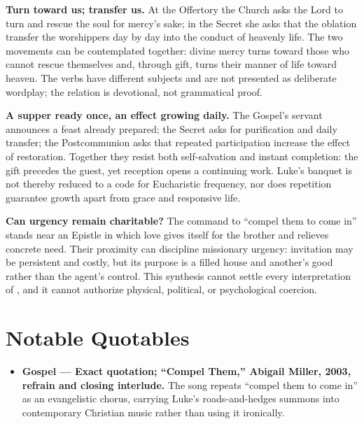 \begin{deepstudy}
\noindent\textbf{Turn toward us; transfer us.\enspace{}}
At the Offertory the Church asks the Lord to turn and rescue the soul for mercy's sake; in the Secret she asks that the oblation transfer the worshippers day by day into the conduct of heavenly life. The two movements can be contemplated together: divine mercy turns toward those who cannot rescue themselves and, through gift, turns their manner of life toward heaven. The verbs have different subjects and are not presented as deliberate wordplay; the relation is devotional, not grammatical proof.

\noindent\textbf{A supper ready once, an effect growing daily.\enspace{}}
The Gospel's servant announces a feast already prepared; the Secret asks for purification and daily transfer; the Postcommunion asks that repeated participation increase the effect of restoration. Together they resist both self-salvation and instant completion: the gift precedes the guest, yet reception opens a continuing work. Luke's banquet is not thereby reduced to a code for Eucharistic frequency, nor does repetition guarantee growth apart from grace and responsive life.

\noindent\textbf{Can urgency remain charitable?\enspace{}}
The command to ``compel them to come in'' stands near an Epistle in which love gives itself for the brother and relieves concrete need. Their proximity can discipline missionary urgency: invitation may be persistent and costly, but its purpose is a filled house and another's good rather than the agent's control. This synthesis cannot settle every interpretation of , and it cannot authorize physical, political, or psychological coercion.

\sectionguard
\section*{Notable Quotables}
{\small
\begin{itemize}[itemsep=0em,topsep=0.15em,parsep=0pt]
\item \textbf{Gospel --- Exact quotation; ``Compel Them,'' Abigail Miller, 2003, refrain and closing interlude.} The song repeats ``compel them to come in'' as an evangelistic chorus, carrying Luke's roads-and-hedges summons into contemporary Christian music rather than using it ironically.
\end{itemize}
}


\end{deepstudy}
